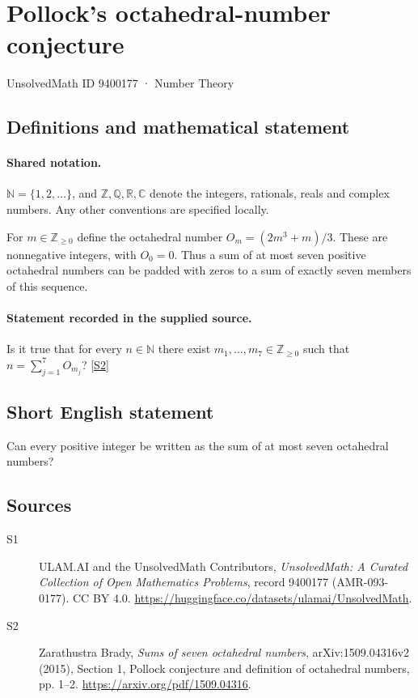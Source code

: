 \documentclass[11pt]{article}
\newcommand{\sref}[2]{\hyperlink{source:#1:#2}{[S#2]}}
\begin{document}
\setcounter{section}{9400176}
\section{Pollock's octahedral-number conjecture}\label{9400177}
{\small\sffamily UnsolvedMath ID 9400177 · Number Theory}
\subsection{Definitions and mathematical statement}

\paragraph{Shared notation.}$\mathbb N=\{1,2,\ldots\}$, and $\mathbb Z,\mathbb Q,\mathbb R,\mathbb C$ denote the integers, rationals, reals and complex numbers. Any other conventions are specified locally.


For $m\in\mathbb Z_{\ge0}$ define the octahedral number $O_m=(2m^3+m)/3$. These are nonnegative integers, with $O_0=0$. Thus a sum of at most seven positive octahedral numbers can be padded with zeros to a sum of exactly seven members of this sequence.
\paragraph{Statement recorded in the supplied source.}
Is it true that for every $n\in\mathbb N$ there exist $m_1,\ldots,m_7\in\mathbb Z_{\ge0}$ such that $n=\sum_{j=1}^7 O_{m_j}$? \sref{9400177}{2}
\subsection{Short English statement}
Can every positive integer be written as the sum of at most seven octahedral numbers?
\subsection{Sources}
\begin{description}
\item[\hypertarget{source:9400177:1}{S1}] ULAM.AI and the UnsolvedMath Contributors, \emph{UnsolvedMath: A Curated Collection of Open Mathematics Problems}, record 9400177 (AMR-093-0177). CC BY 4.0. \url{https://huggingface.co/datasets/ulamai/UnsolvedMath}.
\item[\hypertarget{source:9400177:2}{S2}] Zarathustra Brady, \emph{Sums of seven octahedral numbers}, arXiv:1509.04316v2 (2015), Section 1, Pollock conjecture and definition of octahedral numbers, pp. 1--2. \url{https://arxiv.org/pdf/1509.04316}.
\end{description}
\label{end:9400177}
\end{document}

